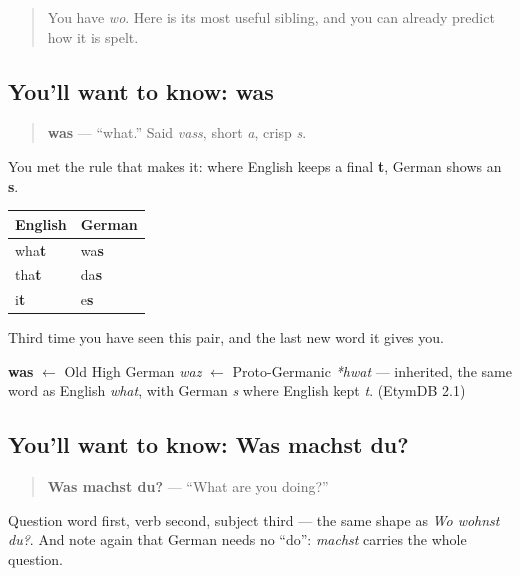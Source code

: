 \label{lesson:GE-C05-was}



\begin{quote}
You have \emph{wo}. Here is its most useful sibling, and you can already predict how it is spelt.
\end{quote}

\subsection*{You'll want to know: was}
\begin{quote}
\textbf{was} — \textquotedblleft{}what.\textquotedblright{} Said \emph{vass}, short \emph{a}, crisp \emph{s}.
\end{quote}

You met the rule that makes it: where English keeps a final \textbf{t}, German shows an \textbf{s}.

\noindent
\begin{tabularx}{\linewidth}{@{}>{\raggedright\arraybackslash}X>{\raggedright\arraybackslash}X@{}}
\toprule
\textbf{English} & \textbf{German} \\
\midrule
wha\textbf{t} & wa\textbf{s} \\
tha\textbf{t} & da\textbf{s} \\
i\textbf{t} & e\textbf{s} \\
\bottomrule
\end{tabularx}

Third time you have seen this pair, and the last new word it gives you.

\begin{cousinweb}
\textbf{was} $\leftarrow$ Old High German \emph{waz} $\leftarrow$ Proto-Germanic \emph{*hwat} — inherited, the same word as English \emph{what}, with German \emph{s} where English kept \emph{t}. (EtymDB 2.1)
\end{cousinweb}

\subsection*{You'll want to know: Was machst du?}
\begin{quote}
\textbf{Was machst du?} — \textquotedblleft{}What are you doing?\textquotedblright{}
\end{quote}

Question word first, verb second, subject third — the same shape as \emph{Wo wohnst du?}. And note again that German needs no \textquotedblleft{}do\textquotedblright{}: \emph{machst} carries the whole question.

